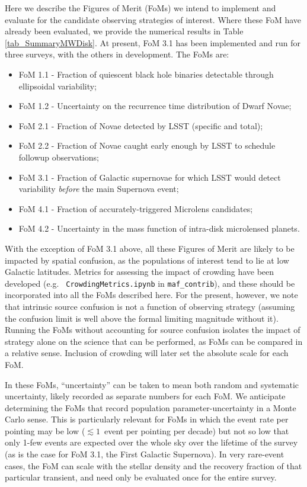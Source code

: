 
Here we describe the Figures of Merit (FoMs) we intend to implement
and evaluate for the candidate observing strategies of interest. Where
these FoM have already been evaluated, we provide the numerical
results in Table \ref{tab_SummaryMWDisk}. At present, FoM 3.1 has been
implemented and run for three surveys, with the others in
development. The FoMs are:

\begin{itemize}
  \item FoM 1.1 - Fraction of quiescent black hole binaries detectable through ellipsoidal variability;
  \item FoM 1.2 - Uncertainty on the recurrence time distribution of Dwarf Novae;
  \item FoM 2.1 - Fraction of Novae detected by LSST (specific and total);
  \item FoM 2.2 - Fraction of Novae caught early enough by LSST to schedule followup observations;
  \item FoM 3.1 - Fraction of Galactic supernovae for which LSST would detect variability {\it before} the main Supernova event;
  \item FoM 4.1 - Fraction of accurately-triggered Microlens candidates;
  \item FoM 4.2 - Uncertainty in the mass function of intra-disk microlensed planets.
\end{itemize}

With the exception of FoM 3.1 above, all these Figures of Merit are
likely to be impacted by spatial confusion, as the populations of
interest tend to lie at low Galactic latitudes. Metrics for assessing
the impact of crowding have been developed (e.g. {\tt
  CrowdingMetrics.ipynb} in {\tt maf\_contrib}), and these should be
incorporated into all the FoMs described here. For the present,
however, we note that intrinsic source confusion is not a function of
observing strategy (assuming the confusion limit is well above the
formal limiting magnitude without it). Running the FoMs without
accounting for source confusion isolates the impact of strategy alone
on the science that can be performed, as FoMs can be compared in a
relative sense. Inclusion of crowding will later set the absolute
scale for each FoM.

In these FoMs, ``uncertainty'' can be taken to mean both random and
systematic uncertainty, likely recorded as separate numbers for each
FoM. We anticipate determining the FoMs that record population
parameter-uncertainty in a Monte Carlo sense. This is particularly
relevant for FoMs in which the event rate per pointing may be low
($\lesssim 1$~event per pointing per decade) but not so low that only
1-few events are expected over the whole sky over the lifetime of the
survey (as is the case for FoM 3.1, the First Galactic Supernova). In
very rare-event cases, the FoM can scale with the stellar density and
the recovery fraction of that particular transient, and need only be
evaluated once for the entire survey.


